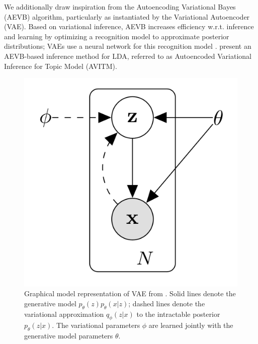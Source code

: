 \documentclass[twoside,twocolumn]{article}
\begin{document}
We additionally draw inspiration from the Autoencoding Variational Bayes (AEVB)
algorithm, particularly as instantiated by the Variational Autoencoder (VAE).
Based on variational inference, AEVB increases efficiency w.r.t. inference and
learning by optimizing a recognition model to approximate posterior
distributions; VAEs use a neural network for this recognition model
\cite{kingma2013auto}.
\cite{srivastava2017autoencoding} present an AEVB-based inference method for
LDA, referred to as Autoencoded Variational Inference for Topic Model (AVITM).

\begin{figure}
\centering
\includegraphics[scale=0.2]{VAEDiagram}
\caption{Graphical model representation of VAE from \cite{kingma2013auto}.
Solid lines denote the generative model $p_\theta(z) p_\theta(x|z)$; dashed
lines denote the variational approximation $q_\phi(z|x)$ to the intractable
posterior $p_\theta(z|x)$. The variational parameters $\phi$ are learned jointly
with the generative model parameters $\theta$.
}
\end{figure}



\end{document}
